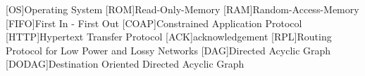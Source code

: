 \begin{acronym}[6LoWPAN]
	[OS]{Operating System}
[ROM]{Read-Only-Memory}
[RAM]{Random-Access-Memory}
[FIFO]{First In - First Out}
[COAP]{Constrained Application Protocol}
[HTTP]{Hypertext Transfer Protocol}
[ACK]{acknowledgement}
[RPL]{Routing Protocol for Low Power and Lossy Networks}
[DAG]{Directed Acyclic Graph}
[DODAG]{Destination Oriented Directed Acyclic Graph}
\end{acronym}